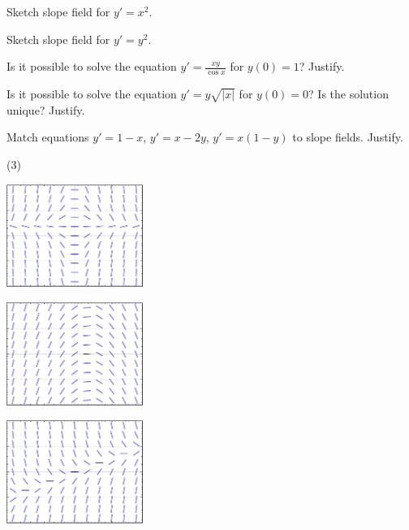 \begin{exercise}
Sketch slope field for $y'=x^2$.
\end{exercise}

\begin{exercise}
Sketch slope field for $y'=y^2$.
\end{exercise}

\begin{exercise}
Is it possible to solve the equation $y' = \frac{xy}{\cos x}$ for $y(0) = 1$?
Justify.
\end{exercise}

\begin{exercise}
Is it possible to solve the equation $y' = y\sqrt{\lvert x\rvert}$ for
$y(0) = 0$?  Is the solution unique?
Justify.
\end{exercise}

\begin{samepage}
\begin{exercise}
Match equations $y'=1-x$, $y'=x-2y$, $y' = x(1-y)$ to slope fields.
Justify.
\begin{tasks}(3)
\task
\parbox[c]{1.75in}{\includegraphics[width=1.75in]{figures/yprimex1minusyslope}}
\task
\parbox[c]{1.75in}{\includegraphics[width=1.75in]{figures/yprime1minusxslope}}
\task
\parbox[c]{1.75in}{\includegraphics[width=1.75in]{figures/yprimexminus2yslope}}
\end{tasks}
\end{exercise}
\end{samepage}

